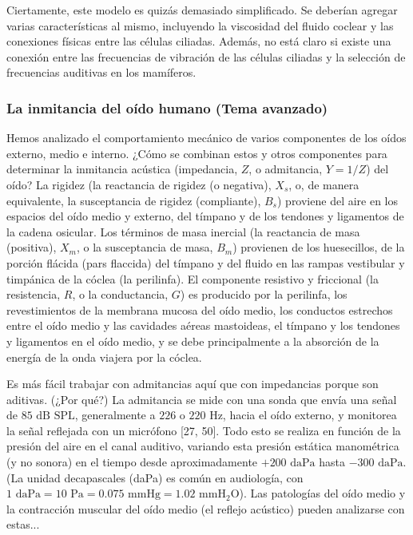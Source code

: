 \documentclass[12pt]{book}
\begin{document}
Ciertamente, este modelo es quizás demasiado simplificado. Se deberían agregar varias características al mismo, incluyendo la viscosidad del fluido coclear y las conexiones físicas entre las células ciliadas. Además, no está claro si existe una conexión entre las frecuencias de vibración de las células ciliadas y la selección de frecuencias auditivas en los mamíferos.

\subsubsection*{La inmitancia del oído humano (Tema avanzado)}

Hemos analizado el comportamiento mecánico de varios componentes de los oídos externo, medio e interno. ¿Cómo se combinan estos y otros componentes para determinar la inmitancia acústica (impedancia, $Z$, o admitancia, $Y = 1/Z$) del oído? La rigidez (la reactancia de rigidez (o negativa), $X_s$, o, de manera equivalente, la susceptancia de rigidez (compliante), $B_s$) proviene del aire en los espacios del oído medio y externo, del tímpano y de los tendones y ligamentos de la cadena osicular. Los términos de masa inercial (la reactancia de masa (positiva), $X_m$, o la susceptancia de masa, $B_m$) provienen de los huesecillos, de la porción flácida (pars flaccida) del tímpano y del fluido en las rampas vestibular y timpánica de la cóclea (la perilinfa). El componente resistivo y friccional (la resistencia, $R$, o la conductancia, $G$) es producido por la perilinfa, los revestimientos de la membrana mucosa del oído medio, los conductos estrechos entre el oído medio y las cavidades aéreas mastoideas, el tímpano y los tendones y ligamentos en el oído medio, y se debe principalmente a la absorción de la energía de la onda viajera por la cóclea.

Es más fácil trabajar con admitancias aquí que con impedancias porque son aditivas. (¿Por qué?) La admitancia se mide con una sonda que envía una señal de $85\text{ dB SPL}$, generalmente a $226$ o $220\text{ Hz}$, hacia el oído externo, y monitorea la señal reflejada con un micrófono [27, 50]. Todo esto se realiza en función de la presión del aire en el canal auditivo, variando esta presión estática manométrica (y no sonora) en el tiempo desde aproximadamente $+200\text{ daPa}$ hasta $-300\text{ daPa}$. (La unidad decapascales (daPa) es común en audiología, con $1\text{ daPa} = 10\text{ Pa} = 0.075\text{ mmHg} = 1.02\text{ mmH}_2\text{O}$). Las patologías del oído medio y la contracción muscular del oído medio (el reflejo acústico) pueden analizarse con estas...
\end{document}

